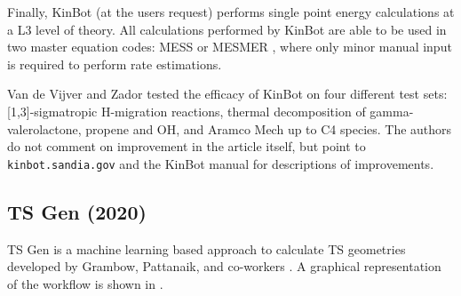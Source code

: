 \documentclass[preprint, 11pt]{elsarticle} %
\begin{document}

Finally, KinBot (at the users request) performs single point energy calculations at a L3 level of theory.
All calculations performed by KinBot are able to be used in two master equation codes: MESS \cite{MESS:2013} or MESMER \cite{MESMER:2012}, where only minor manual input is required to perform rate estimations.

Van de Vijver and Zador tested the efficacy of KinBot on four different test sets: [1,3]-sigmatropic H-migration reactions, thermal decomposition of gamma-valerolactone, propene and OH, and Aramco Mech up to C4 species.
The authors do not comment on improvement in the article itself, but point to \texttt{kinbot.sandia.gov} and the KinBot manual for descriptions of improvements.


\subsection{TS Gen (2020)}

TS Gen is a machine learning based approach to calculate TS geometries developed by Grambow, Pattanaik, and co-workers \cite{grambow:2020, pattanaik:2020}.
A graphical representation of the workflow is shown in .
\end{document}
